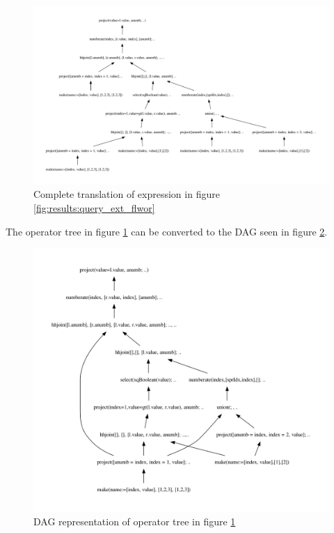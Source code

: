 \begin{figure}[htp]
\begin{center}
  \includegraphics[scale=0.4]{img/graphs/ext_flwor}
  \caption{Complete translation of expression in figure
  \ref{fig:results:query_ext_flwor}}
  \label{fig:results:query_ext_flwor_result}
\end{center}
\end{figure}

The operator tree in figure \ref{fig:results:query_ext_flwor_result} can be
converted to the DAG seen in figure \ref{fig:results:query_ext_flwor_dag}.

\newpage

\begin{figure}[!htp]
  \includegraphics[scale=0.5]{img/graphs/ext_flwor_dag}
  \caption{DAG representation of operator tree in figure
  \ref{fig:results:query_ext_flwor_result}}
  \label{fig:results:query_ext_flwor_dag}
\end{figure}

